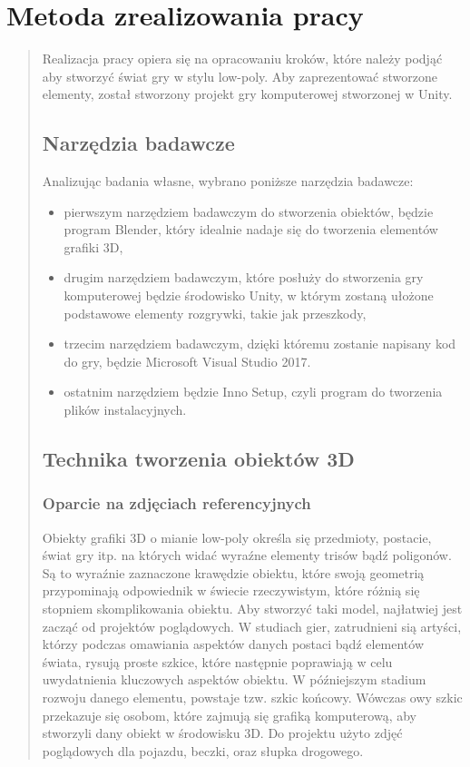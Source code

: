 \chapter{Metoda zrealizowania pracy}
\begin{quotation}
\indent Realizacja pracy opiera się na opracowaniu kroków, które należy podjąć aby stworzyć świat gry w stylu low-poly. Aby zaprezentować stworzone elementy, został stworzony projekt gry komputerowej stworzonej w Unity.
\section{Narzędzia badawcze}
 Analizując badania własne, wybrano poniższe narzędzia badawcze:
\begin{itemize}
\item pierwszym narzędziem badawczym do stworzenia obiektów, będzie program Blender, który idealnie nadaje się do tworzenia elementów grafiki 3D,

\item drugim narzędziem badawczym, które posłuży do stworzenia gry komputerowej będzie środowisko Unity, w którym zostaną ułożone podstawowe elementy rozgrywki, takie jak przeszkody,

\item trzecim narzędziem badawczym, dzięki któremu zostanie napisany kod do gry, będzie Microsoft Visual Studio 2017.

\item ostatnim narzędziem będzie Inno Setup, czyli program do tworzenia plików instalacyjnych.

\end{itemize}

\section{Technika tworzenia obiektów 3D}
\subsection{Oparcie na zdjęciach referencyjnych}
\indent Obiekty grafiki 3D o mianie low-poly określa się przedmioty, postacie, świat gry itp. na których widać wyraźne elementy trisów bądź poligonów. Są to wyraźnie zaznaczone krawędzie obiektu, które swoją geometrią przypominają odpowiednik w świecie rzeczywistym, które różnią się stopniem skomplikowania obiektu. Aby stworzyć taki model, najłatwiej jest zacząć od projektów poglądowych. W studiach gier, zatrudnieni sią artyści, którzy podczas omawiania aspektów danych postaci bądź elementów świata, rysują proste szkice, które następnie poprawiają w celu uwydatnienia kluczowych aspektów obiektu. 
W późniejszym stadium rozwoju danego elementu, powstaje tzw. szkic końcowy. Wówczas owy szkic przekazuje się osobom, które zajmują się grafiką komputerową, aby stworzyli dany obiekt w środowisku 3D. Do projektu użyto zdjęć poglądowych dla pojazdu, beczki, oraz słupka drogowego.


\end{quotation}
